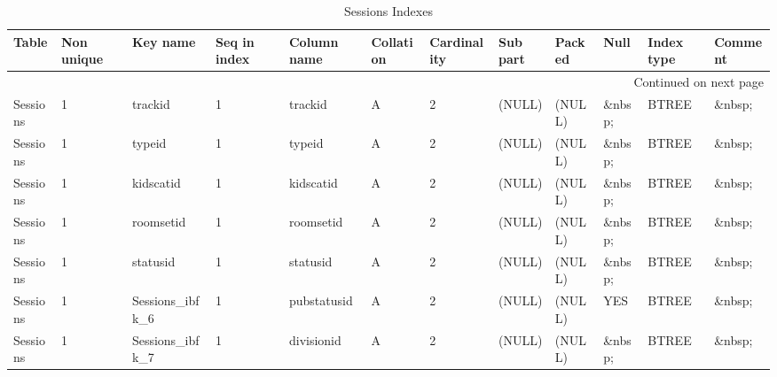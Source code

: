\documentclass[tablesignature,landscape]{scrartcl}
\begin{document}
\begin{longtable}{|l|l|l|l|l|l|l|l|l|l|l|l|}
\caption{Sessions Indexes} \label{tbl:sessionsindexes}\\
\hline
 Table     &  Non unique  &  Key name               &  Seq in index  &  Column name  &  Collation  &  Cardinality  &  Sub part  &  Packed  &  Null     &  Index type  &  Comment \\
\hline
\endhead
\hline\multicolumn{12}{r}{Continued on next page}\
\endfoot
\endlastfoot
\hline
 Sessions  &           0  &  PRIMARY                &             1  &  sessionid    &  A          &            2  &  (NULL)    &  (NULL)  &  \&nbsp;  &  BTREE       &  \&nbsp;  \\
 Sessions  &           1  &  trackid                &             1  &  trackid      &  A          &            2  &  (NULL)    &  (NULL)  &  \&nbsp;  &  BTREE       &  \&nbsp;  \\
 Sessions  &           1  &  typeid                 &             1  &  typeid       &  A          &            2  &  (NULL)    &  (NULL)  &  \&nbsp;  &  BTREE       &  \&nbsp;  \\
 Sessions  &           1  &  kidscatid              &             1  &  kidscatid    &  A          &            2  &  (NULL)    &  (NULL)  &  \&nbsp;  &  BTREE       &  \&nbsp;  \\
 Sessions  &           1  &  roomsetid              &             1  &  roomsetid    &  A          &            2  &  (NULL)    &  (NULL)  &  \&nbsp;  &  BTREE       &  \&nbsp;  \\
 Sessions  &           1  &  statusid               &             1  &  statusid     &  A          &            2  &  (NULL)    &  (NULL)  &  \&nbsp;  &  BTREE       &  \&nbsp;  \\
 Sessions  &           1  &  Sessions\_{}ibfk\_{}6  &             1  &  pubstatusid  &  A          &            2  &  (NULL)    &  (NULL)  &  YES      &  BTREE       &  \&nbsp;  \\
 Sessions  &           1  &  Sessions\_{}ibfk\_{}7  &             1  &  divisionid   &  A          &            2  &  (NULL)    &  (NULL)  &  \&nbsp;  &  BTREE       &  \&nbsp;  \\
\hline
\end{longtable}
\end{document}
